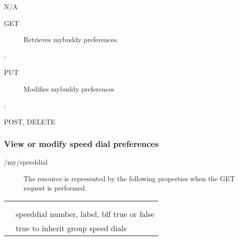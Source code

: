 \documentclass[letterpaper,10pt,english]{sphinxmanual}
\begin{document}
 N/A
\begin{description}
\item[{ GET}] \leavevmode
Retrieves mybuddy preferences.

\end{description}

:

\begin{sphinxVerbatim}[commandchars=\\\{\}]
\end{sphinxVerbatim}
\begin{description}
\item[{ PUT}] \leavevmode
Modifies mybuddy preferences

\end{description}

:

\begin{sphinxVerbatim}[commandchars=\\\{\}]
\end{sphinxVerbatim}

 POST, DELETE


\subsubsection{View or modify speed dial preferences}
\label{\detokenize{restapi:view-or-modify-speed-dial-preferences}}
 /my/speeddial
\begin{description}
\item[{}] \leavevmode
The resource is represented by the following properties when the GET request is performed.

\end{description}


\begin{savenotes}\sphinxattablestart
\centering
\begin{tabulary}{\linewidth}[t]{|T|T|}
\hline

&
\\
\hline
{}
&\\
\hline
{}
&\\
\hline
{}
&
speeddial number, label, blf true or false
\\
\hline
{}
&
true to inherit group speed dials
\\
\hline
\end{tabulary}
\par
\sphinxattableend\end{savenotes}
\end{document}
